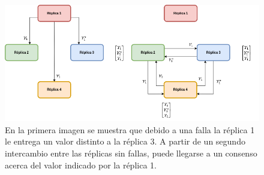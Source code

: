 

\begin{figure}[htb]
    \centering
    \includegraphics[width=\textwidth]{img/byzantine_ejemplo_3.png}
    \caption{En la primera imagen se muestra que debido a una falla la réplica 1 le entrega un valor distinto a la réplica 3. A partir de un segundo intercambio entre las réplicas sin fallas, puede llegarse a un consenso acerca del valor indicado por la réplica 1.}
    \label{fig:byzantine_ejemplo_3}
\end{figure}

